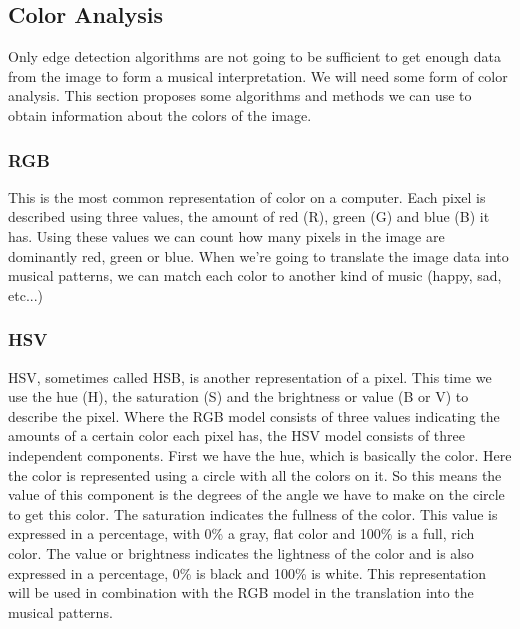 \documentclass[12pt]{article}
\begin{document}
\subsection{Color Analysis}
Only edge detection algorithms are not going to be sufficient to get enough data from the image to form a musical interpretation. We will need some form of color analysis. This section proposes some algorithms and methods we can use to obtain information about the colors of the image.

\subsubsection{RGB}
This is the most common representation of color on a computer. Each pixel is described using three values, the amount of red (R), green (G) and blue (B) it has. Using these values we can count how many pixels in the image are dominantly red, green or blue. When we're going to translate the image data into musical patterns, we can match each color to another kind of music (happy, sad, etc...)
 
\subsubsection{HSV}
HSV, sometimes called HSB, is another representation of a pixel. This time we use the hue (H), the saturation (S) and the brightness or value (B or V) to describe the pixel. Where the RGB model consists of three values indicating the amounts of a certain color each pixel has, the HSV model consists of three independent components. 
\newline
\newline
First we have the hue, which is basically the color. Here the color is represented using a circle with all the colors on it. So this means the value of this component is the degrees of the angle we have to make on the circle to get this color.  
\newline
\newline
The saturation indicates the fullness of the color. This value is expressed in a percentage, with 0\% a gray, flat color and 100\% is a full, rich color.
\newline
\newline
The value or brightness indicates the lightness of the color and is also expressed in a percentage, 0\% is black and 100\% is white.
\newline
\newline
This representation will be used in combination with the RGB model in the translation into the musical patterns.
 
\end{document}
